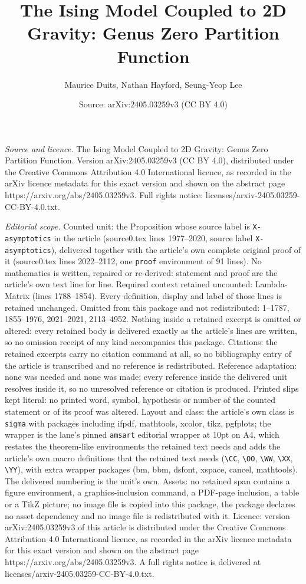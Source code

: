 \documentclass[10pt,a4paper]{amsart}
\title[The Ising Model Coupled to 2D Gravity: Genus Zero Partition ]{The Ising Model Coupled to 2D Gravity: Genus Zero Partition Function}
\author{Maurice Duits, Nathan Hayford, Seung-Yeop Lee}
\date{Source: arXiv:2405.03259v3 (CC BY 4.0)}
\begin{document}
\maketitle

\noindent\emph{Source and licence.} The Ising Model Coupled to 2D Gravity: Genus Zero Partition Function. Version arXiv:2405.03259v3 (CC BY 4.0), distributed under the Creative Commons Attribution 4.0 International licence, as recorded in the arXiv licence metadata for this exact version and shown on the abstract page https://arxiv.org/abs/2405.03259v3. Full rights notice: licenses/arxiv-2405.03259-CC-BY-4.0.txt.\par\smallskip

\noindent\textit{Editorial scope.} Counted unit: the Proposition whose source label is \texttt{X-asymptotics} in the article (source0.tex lines 1977--2020, source label \texttt{X-asymptotics}), delivered together with the article's own complete original proof of it (source0.tex lines 2022--2112, one \texttt{proof} environment of 91 lines). No mathematics is written, repaired or re-derived: statement and proof are the article's own text line for line. Required context retained uncounted: Lambda-Matrix (lines 1788--1854). Every definition, display and label of those lines is retained unchanged. Omitted from this package and not redistributed: 1--1787, 1855--1976, 2021--2021, 2113--4952. Nothing inside a retained excerpt is omitted or altered: every retained body is delivered exactly as the article's lines are written, so no omission receipt of any kind accompanies this package. Citations: the retained excerpts carry no citation command at all, so no bibliography entry of the article is transcribed and no reference is redistributed. Reference adaptation: none was needed and none was made; every reference inside the delivered unit resolves inside it, so no unresolved reference or citation is produced. Printed slips kept literal: no printed word, symbol, hypothesis or number of the counted statement or of its proof was altered. Layout and class: the article's own class is \texttt{sigma} with packages including ifpdf, mathtools, xcolor, tikz, pgfplots; the wrapper is the lane's pinned \texttt{amsart} editorial wrapper at 10pt on A4, which restates the theorem-like environments the retained text needs and adds the article's own macro definitions that the retained text needs (\texttt{\textbackslash CC}, \texttt{\textbackslash OO}, \texttt{\textbackslash WW}, \texttt{\textbackslash XX}, \texttt{\textbackslash YY}), with extra wrapper packages (bm, bbm, dsfont, xspace, cancel, mathtools). The delivered numbering is the unit's own. Assets: no retained span contains a figure environment, a graphics-inclusion command, a PDF-page inclusion, a table or a TikZ picture; no image file is copied into this package, the package declares no asset dependency and no image file is redistributed with it. Licence: version arXiv:2405.03259v3 of this article is distributed under the Creative Commons Attribution 4.0 International licence, as recorded in the arXiv licence metadata for this exact version and shown on the abstract page https://arxiv.org/abs/2405.03259v3. A full rights notice is delivered at licenses/arxiv-2405.03259-CC-BY-4.0.txt. 
\end{document}
